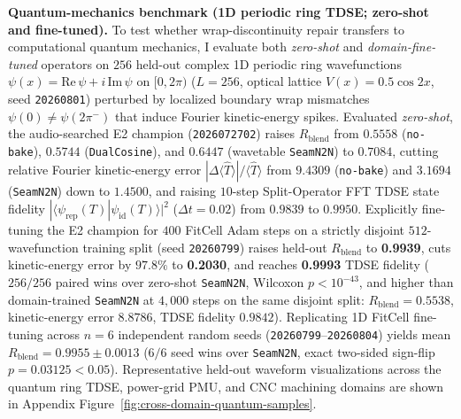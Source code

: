 \textbf{Quantum-mechanics benchmark (1D periodic ring TDSE; zero-shot and fine-tuned).}
To test whether wrap-discontinuity repair transfers to computational quantum mechanics, I evaluate both \emph{zero-shot} and \emph{domain-fine-tuned} operators on $256$ held-out complex 1D periodic ring wavefunctions $\psi(x){=}\mathrm{Re}\,\psi+i\,\mathrm{Im}\,\psi$ on $[0,2\pi)$ ($L{=}256$, optical lattice $V(x){=}0.5\cos 2x$, seed \texttt{20260801}) perturbed by localized boundary wrap mismatches $\psi(0)\neq\psi(2\pi^-)$ that induce Fourier kinetic-energy spikes.
Evaluated \emph{zero-shot}, the audio-searched E2 champion (\texttt{2026072702}) raises $R_{\mathrm{blend}}$ from $0.5558$ (\texttt{no-bake}), $0.5744$ (\texttt{DualCosine}), and $0.6447$ (wavetable \texttt{SeamN2N}) to $0.7084$, cutting relative Fourier kinetic-energy error $|\Delta\langle\hat{T}\rangle|/\langle\hat{T}\rangle$ from $9.4309$ (\texttt{no-bake}) and $3.1694$ (\texttt{SeamN2N}) down to $1.4500$, and raising $10$-step Split-Operator FFT TDSE state fidelity $|\langle\psi_{\mathrm{rep}}(T)|\psi_{\mathrm{id}}(T)\rangle|^2$ ($\Delta t{=}0.02$) from $0.9839$ to $0.9950$.
Explicitly fine-tuning the E2 champion for $400$ FitCell Adam steps on a strictly disjoint $512$-wavefunction training split (seed \texttt{20260799}) raises held-out $R_{\mathrm{blend}}$ to \textbf{0.9939}, cuts kinetic-energy error by $97.8\%$ to \textbf{0.2030}, and reaches \textbf{0.9993} TDSE fidelity ($256/256$ paired wins over zero-shot \texttt{SeamN2N}, Wilcoxon $p{<}10^{-43}$, and higher than domain-trained \texttt{SeamN2N} at $4{,}000$ steps on the same disjoint split: $R_{\mathrm{blend}}{=}0.5538$, kinetic-energy error $8.8786$, TDSE fidelity $0.9842$). Replicating 1D FitCell fine-tuning across $n{=}6$ independent random seeds (\texttt{20260799}--\texttt{20260804}) yields mean $R_{\mathrm{blend}}{=}\mathbf{0.9955{\pm}0.0013}$ ($6/6$ seed wins over \texttt{SeamN2N}, exact two-sided sign-flip $p{=}0.03125<0.05$). Representative held-out waveform visualizations across the quantum ring TDSE, power-grid PMU, and CNC machining domains are shown in Appendix Figure~\ref{fig:cross-domain-quantum-samples}.

